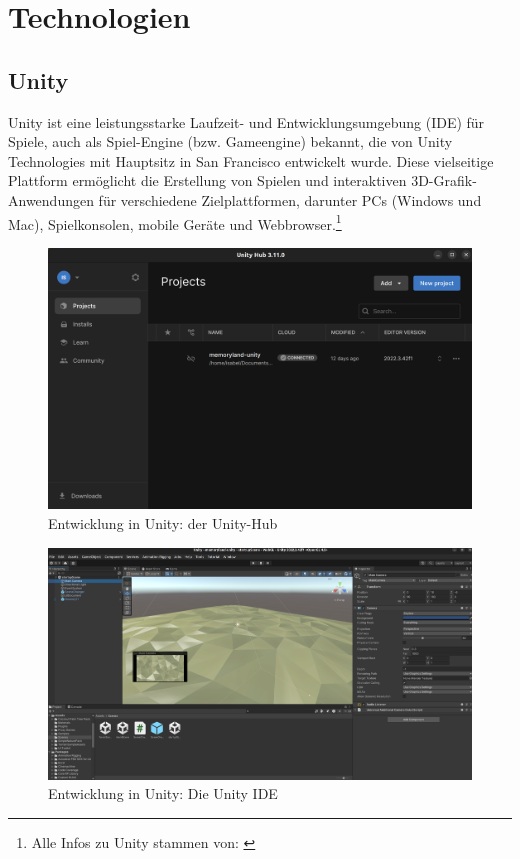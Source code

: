 
\section{Technologien}

\subsection{Unity}

Unity ist eine leistungsstarke Laufzeit- und Entwicklungsumgebung (IDE) für Spiele, auch als Spiel-Engine (bzw. Gameengine) bekannt, die von Unity Technologies mit Hauptsitz in San Francisco entwickelt wurde. Diese vielseitige Plattform ermöglicht die Erstellung von Spielen und interaktiven 3D-Grafik-Anwendungen für verschiedene Zielplattformen, darunter PCs (Windows und Mac), Spielkonsolen, mobile Geräte und Webbrowser.\footnote{Alle Infos zu Unity stammen von: \cite{UnityDocs}}

\begin{figure} [h t]
    \centering
    \includegraphics[scale=0.5]{pics/unity-hub.png}
    \caption{Entwicklung in Unity: der Unity-Hub}
    \label{fig:unity-hub}
\end{figure}


\begin{figure} [h t]
    \centering
    \includegraphics[scale=0.5]{pics/unity-ide.png}
    \caption{Entwicklung in Unity: Die Unity IDE}
    \label{fig:unity-ide}
\end{figure}


